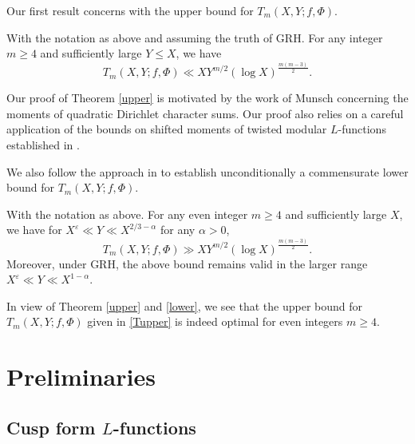 \documentclass[twoside,leqno,10pt, A4]{amsart}
\begin{document}
  Our first result concerns with the upper bound for $T_m(X,Y;f,\Phi)$.
\begin{theorem}\label{upper}
  With the notation as above and assuming the truth of GRH. For any integer $m\geq 4$ and sufficiently large $Y\leq X$, we have
  \begin{equation}
  \label{Tupper}
  T_m(X,Y;f,\Phi) \ll XY^{m/2} (\log X)^{\frac{m(m-3)}{2 }}.
  \end{equation}
\end{theorem}

   Our proof of Theorem \ref{upper} is motivated by the work of Munsch \cite{Mun} concerning the moments of quadratic Dirichlet character sums. Our proof also relies on a careful application of the bounds on shifted moments of twisted modular $L$-functions established in \cite[Corollary 1.4]{G&Zhao24-12}.

   We also follow the approach in \cite{Mun} to establish unconditionally a commensurate lower bound for $T_m(X,Y;f,\Phi)$.
\begin{theorem}\label{lower}
  With the notation as above. For any even integer $m\geq 4$ and sufficiently large $X$, we have for $X^{\varepsilon} \ll Y\ll X^{2/3-\alpha}$ for any $\alpha>0$,
\begin{equation*}
  T_m(X,Y;f,\Phi) \gg XY^{m/2} (\log X)^{\frac{m(m-3)}{2 }}.
\end{equation*}
 Moreover, under GRH, the above bound remains valid in the larger range  $X^{\varepsilon} \ll Y\ll X^{1-\alpha}$.
\end{theorem}

   In view of Theorem \ref{upper} and \ref{lower}, we see that the upper bound for $T_m(X,Y;f,\Phi)$ given in \eqref{Tupper} is indeed optimal for even integers $m \geq 4$.

\section{Preliminaries}\label{sec 2}


\subsection{Cusp form $L$-functions}
\label{sec:cusp form}
\end{document}
